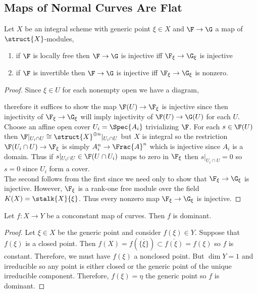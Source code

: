 \documentclass[12pt]{article}
\begin{document}
\subsection{Maps of Normal Curves Are Flat}

\begin{lemma} \label{generic_injection}
Let $X$ be an integral scheme with generic point $\xi \in X$ and $\F \to \G$ a map of $\struct{X}$-modules,
\begin{enumerate}
\item if $\F$ is locally free then $\F \to \G$ is injective iff $\F_\xi \to \G_\xi$ is injective
\item if $\F$ is invertible then $\F \to \G$ is injective iff $\F_\xi \to \G_\xi$ is nonzero.
\end{enumerate}
\end{lemma}

\begin{proof}
Since $\xi \in U$ for each nonempty open we have a diagram,
\begin{center}
\end{center}
therefore it suffices to show the map $\F(U) \to \F_\xi$ is injective since then injectivity of $\F_\xi \to \G_\xi$ will imply injectivity of $\F(U) \to \G(U)$ for each $U$. Choose an affine open cover $U_i = \Spec{A_i}$ trivializing $\F$. For each $s \in \F(U)$ then $\F|_{U_i \cap U} \cong \struct{X}^{\oplus n}|_{U_i \cap U}$ but $X$ is integral so the restriction $\F(U_i \cap U) \to \F_\xi$ is simply $A_i^n \to \Frac{A}^n$ which is injective since $A_i$ is a domain. Thus if $s|_{U_i \cap U} \in \F(U \cap U_i)$ maps to zero in $\F_\xi$ then $s|_{U_i \cap U} = 0$ so $s = 0$ since $U_i$ form a cover.
\bigskip\\
The second follows from the first since we need only to show that $\F_\xi \to \G_\xi$ is injective. However, $\F_\xi$ is a rank-one free module over the field $K(X) = \stalk{X}{\xi}$. Thus every nonzero map $\F_\xi \to \G_\xi$ is injective.
\end{proof}

\begin{lemma}
Let $f : X \to Y$ be a conconstant map of curves. Then $f$ is dominant.
\end{lemma}

\begin{proof}
Let $\xi \in X$ be the generic point and consider $f(\xi) \in Y$. Suppose that $f(\xi)$ is a closed point. Then $f(X) = f(\overline{\{ \xi \}}) \subset \overline{f(\xi)} = f(\xi)$ so $f$ is constant. Therefore, we must have $f(\xi)$ a nonclosed point. But $\dim{Y} = 1$ and irreducible so any point is either closed or the generic point of the unique irreducible component. Therefore, $f(\xi) = \eta$ the generic point so $f$ is dominant.
\end{proof}
\end{document}
